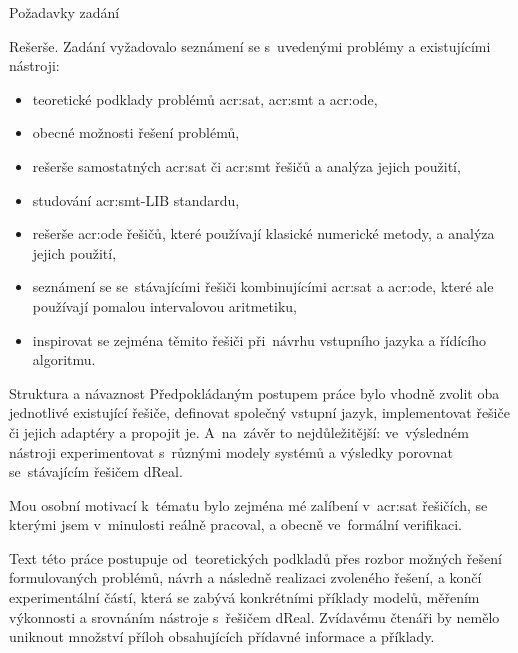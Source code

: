 \documentclass[thesis=M,czech]{FITthesis}[2012/06/26]
\newcommand{\acrlabel}[1]{acr:#1}
\newcommand{\acr}[1]{\acrshort{\acrlabel{#1}}}
\begin{document}
\begin{introduction}
\begin{section}{Požadavky zadání}
\begin{paragraph}{Rešerše.}\label{p:intro:req:search}
Zadání vyžadovalo seznámení se
s~uvedenými problémy a existujícími nástroji:
\begin{itemize}
\item teoretické podklady problémů \acr{sat}, \acr{smt} a \acr{ode},
\item obecné možnosti řešení problémů,
\item rešerše samostatných \acr{sat} či \acr{smt} řešičů
   a analýza jejich použití,
\item studování \acr{smt}-LIB standardu,
\item rešerše \acr{ode} řešičů, které používají klasické numerické metody,
   a analýza jejich použití,
\item seznámení se se~stávajícími řešiči kombinujícími
   \acr{sat} a \acr{ode},
   které ale používají pomalou intervalovou aritmetiku,
\item inspirovat se zejména těmito řešiči
   při~návrhu vstupního jazyka a řídícího algoritmu.
\end{itemize}
\end{paragraph} %


\end{section} %


\begin{section}{Struktura a návaznost}\label{s:intro:struct}
Předpokládaným postupem práce
bylo vhodně zvolit
oba jednotlivé existující řešiče,
definovat společný vstupní jazyk,
implementovat řešiče či jejich adaptéry
a propojit je.
A~na~závěr to nejdůležitější:
ve~výsledném nástroji
experimentovat s~různými modely systémů
a výsledky porovnat se~stávajícím řešičem dReal.

Mou osobní motivací k~tématu bylo zejména mé zalíbení
v~\acr{sat} řešičích, se kterými jsem v~minulosti reálně pracoval,
a obecně ve~formální verifikaci.

Text této práce postupuje od~teoretických podkladů
přes rozbor možných řešení formulovaných problémů,
návrh a následně realizaci zvoleného řešení,
a končí experimentální částí,
která se zabývá konkrétními příklady modelů,
měřením výkonnosti a srovnáním nástroje s~řešičem dReal.
Zvídavému čtenáři by nemělo uniknout
množství příloh obsahujících
přídavné informace a příklady.
\end{section} %


\end{introduction}
\end{document}
